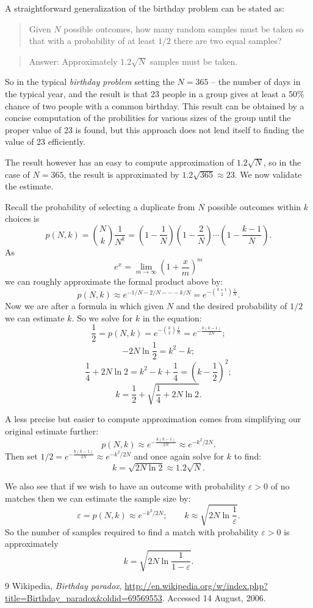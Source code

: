 \documentclass[12pt]{article}
\begin{document}
A straightforward generalization of the birthday problem can be stated as:
\begin{quote}
Given $N$ possible outcomes, how many random samples must be taken so that with a probability of at least $1/2$ there are two equal samples?
\end{quote}
\begin{quote}
Answer: Approximately $1.2\sqrt{N}$ samples must be taken.
\end{quote}

So in the typical \emph{birthday problem} setting the $N=365$ -- the number of days in the typical year, and the result is that 23 people in a group gives at least a 50\% chance of two people with a common birthday.  This result can be obtained by a concise computation of the probilities for various sizes of the group until the proper value of 23 is found, but this approach does not lend itself to finding the value of 23 efficiently.  

The result however has an easy to compute approximation of $1.2\sqrt{N}$, so in the case of $N=365$, the result is approximated by $1.2\sqrt{365}\approx 23$.  We now validate the estimate.

Recall the probability of selecting a duplicate from $N$ possible outcomes within $k$ choices is
\[p(N,k)=\binom{N}{k}\frac{1}{N^k}
=\left(1-\frac{1}{N}\right)\left(1-\frac{2}{N}\right)
\cdots\left(1-\frac{k-1}{N}\right).\]
As 
\[e^x=\lim_{m\rightarrow \infty}\left( 1+ \frac{x}{m}\right)^{m}\]
we can roughly approximate the formal product above by:
\[p(N,k)\approx e^{-1/N-2/N-\cdots - k/N}=e^{-\binom{k+1}{2}\frac{1}{N}}.\]
Now we are after a formula in which given $N$ and the desired probability of $1/2$ we can estimate $k$.  So we solve for $k$ in the equation:
\[\frac{1}{2}=p(N,k)=e^{-\binom{k}{2}\frac{1}{N}}=e^{-\frac{k(k-1)}{2N}};\]
\[-2N\ln \frac{1}{2} = k^2-k;\]
\[\frac{1}{4}+2N\ln 2 = k^2-k+\frac{1}{4}=\left( k-\frac{1}{2}\right)^2;\]
\begin{equation}\label{eq:2}
k=\frac{1}{2}+\sqrt{\frac{1}{4}+2N\ln 2}.
\end{equation}

A less precise but easier to compute approximation comes from simplifying our original estimate further:
\[p(N,k)\approx e^{-\frac{k(k-1)}{2N}}\approx e^{-k^2/2N}.\]
Then set $\displaystyle 1/2=e^{-\frac{k(k-1)}{2N}}\approx e^{-k^2/2N}$ and once
again solve for $k$ to find:
\[k=\sqrt{2N \ln 2}\approx 1.2\sqrt{N}.\]

We also see that if we wish to have an outcome with probability $\varepsilon>0$ of no matches then we can estimate the sample size by:
\[\varepsilon=p(N,k)\approx e^{-k^2/2N};\qquad k\approx \sqrt{2N \ln \frac{1}{\varepsilon}}.\]
So the number of samples required to find a match with probability $\varepsilon>0$ is approximately
\[k=\sqrt{2N \ln \frac{1}{1-\varepsilon}}.\]

\begin{thebibliography}{9}
Wikipedia, \emph{Birthday paradox}, 
\url{http://en.wikipedia.org/w/index.php?title=Birthday_paradox&oldid=69569553}.  Accessed 14 August, 2006.
\end{thebibliography}
\end{document}
